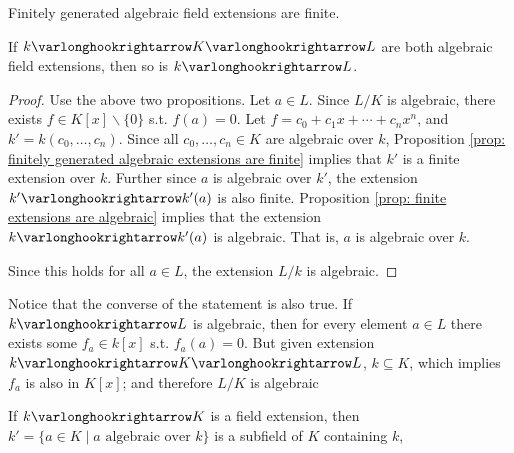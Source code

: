 \begin{corollary}
    Finitely generated algebraic field extensions are finite.
\end{corollary}

\begin{proposition}\label{prop: transitivity of algebraic extensions}
    If $k \ext K \ext L$ are both algebraic field extensions, then so is $k \ext L$.
\end{proposition}

\begin{proof}
    Use the above two propositions. Let $a \in L$. Since $L/K$ is algebraic, there exists $f \in K[x] \smallsetminus \{0\}$ s.t. $f(a) = 0$. Let $f = c_0 + c_1 x + \cdots + c_n x^n$, and $k' = k(c_0, \dots, c_n)$. Since all $c_0, \dots, c_n \in K$ are algebraic over $k$, Proposition \ref{prop: finitely generated algebraic extensions are finite} implies that $k'$ is a finite extension over $k$. Further since $a$ is algebraic over $k'$, the extension $k' \ext k'(a)$ is also finite. Proposition \ref{prop: finite extensions are algebraic} implies that the extension $k \ext k'(a)$ is algebraic. That is, $a$ is algebraic over $k$.

    Since this holds for all $a \in L$, the extension $L/k$ is algebraic.
\end{proof}

\begin{remark}\label{rmk: subextension of algebraic extension is algebraic}
    Notice that the converse of the statement is also true. If $k \ext L$ is algebraic, then for every element $a \in L$ there exists some $f_a \in k[x]$ s.t. $f_a(a) = 0$. But given extension $k \ext K \ext L$, $k \subseteq K$, which implies $f_a$ is also in $K[x]$; and therefore $L/K$ is algebraic
\end{remark}

\begin{proposition}\label{prop: algebraic closure is a field}
    If $k \ext K$ is a field extension, then $k' = \{a \in K \mid \text{$a$ algebraic over $k$}\}$ is a subfield of $K$ containing $k$,
\end{proposition}


